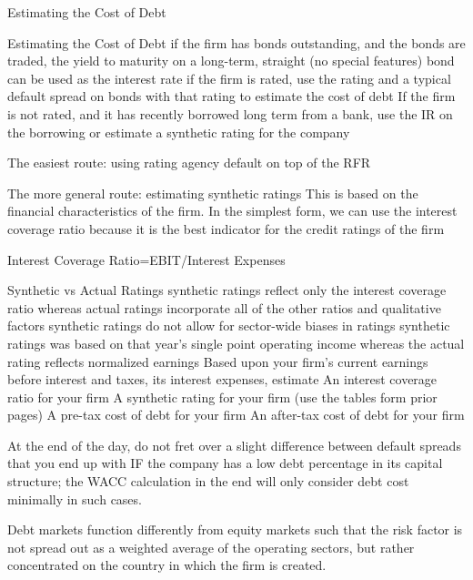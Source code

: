 \documentclass[10pt]{article}
\begin{document}
    \begin{core}{Estimating the Cost of Debt}

      Estimating the Cost of Debt
      if the firm has bonds outstanding, and the bonds are traded, the yield to maturity on a long-term, straight (no special features) bond can be used as the interest rate
      if the firm is rated, use the rating and a typical default spread on bonds with that rating to estimate the cost of debt
      If the firm is not rated,
      and it has recently borrowed long term from a bank, use the IR on the borrowing or
      estimate a synthetic rating for the company

      The easiest route: using rating agency default on top of the RFR

      The more general route: estimating synthetic ratings
      This is based on the financial characteristics of the firm. In the simplest form, we can use the interest coverage ratio because it is the best indicator for the credit ratings of the firm

      Interest Coverage Ratio=EBIT/Interest Expenses

      Synthetic vs Actual Ratings
      synthetic ratings reflect only the interest coverage ratio whereas actual ratings incorporate all of the other ratios and qualitative factors
      synthetic ratings do not allow for sector-wide biases in ratings
      synthetic ratings was based on that year’s single point operating income whereas the actual rating reflects normalized earnings
      Based upon your firm’s current earnings before interest and taxes, its interest expenses, estimate
      An interest coverage ratio for your firm
      A synthetic rating for your firm (use the tables form prior pages)
      A pre-tax cost of debt for your firm
      An after-tax cost of debt for your firm

      At the end of the day, do not fret over a slight difference between default spreads that you end up with IF the company has a low debt percentage in its capital structure; the WACC calculation in the end will only consider debt cost minimally in such cases.

      Debt markets function differently from equity markets such that the risk factor is not spread out as a weighted average of the operating sectors, but rather concentrated on the country in which the firm is created.

    \end{core}
\end{document}
